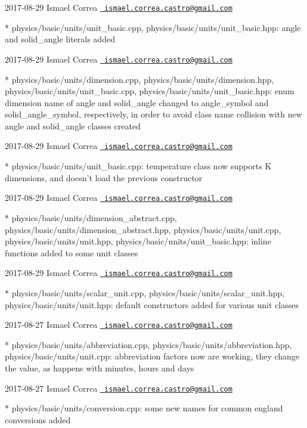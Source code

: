  2017-\/08-\/29 Ismael Correa \href{mailto:ismael.correa.castro@gmail.com}{\texttt{ ismael.\+correa.\+castro@gmail.\+com}} \begin{DoxyVerb}* physics/basic/units/unit_basic.cpp,
physics/basic/units/unit_basic.hpp: angle and solid_angle literals
added
\end{DoxyVerb}
 2017-\/08-\/29 Ismael Correa \href{mailto:ismael.correa.castro@gmail.com}{\texttt{ ismael.\+correa.\+castro@gmail.\+com}} \begin{DoxyVerb}* physics/basic/units/dimension.cpp,
physics/basic/units/dimension.hpp,
physics/basic/units/unit_basic.cpp,
physics/basic/units/unit_basic.hpp: enum dimension name of angle and
solid_angle changed to angle_symbol and solid_angle_symbol,
respectively, in order to avoid class name collision with new angle
and solid_angle classes created
\end{DoxyVerb}
 2017-\/08-\/29 Ismael Correa \href{mailto:ismael.correa.castro@gmail.com}{\texttt{ ismael.\+correa.\+castro@gmail.\+com}} \begin{DoxyVerb}* physics/basic/units/unit_basic.cpp: temperature class now supports
K dimensions, and doesn't load the previous constructor
\end{DoxyVerb}
 2017-\/08-\/29 Ismael Correa \href{mailto:ismael.correa.castro@gmail.com}{\texttt{ ismael.\+correa.\+castro@gmail.\+com}} \begin{DoxyVerb}* physics/basic/units/dimension_abstract.cpp,
physics/basic/units/dimension_abstract.hpp,
physics/basic/units/unit.cpp, physics/basic/units/unit.hpp,
physics/basic/units/unit_basic.hpp: inline functions added to some
unit classes
\end{DoxyVerb}
 2017-\/08-\/29 Ismael Correa \href{mailto:ismael.correa.castro@gmail.com}{\texttt{ ismael.\+correa.\+castro@gmail.\+com}} \begin{DoxyVerb}* physics/basic/units/scalar_unit.cpp,
physics/basic/units/scalar_unit.hpp, physics/basic/units/unit.hpp: 
default constructors added for various unit classes
\end{DoxyVerb}
 2017-\/08-\/27 Ismael Correa \href{mailto:ismael.correa.castro@gmail.com}{\texttt{ ismael.\+correa.\+castro@gmail.\+com}} \begin{DoxyVerb}* physics/basic/units/abbreviation.cpp,
physics/basic/units/abbreviation.hpp, physics/basic/units/unit.cpp: 
abbreviation factors now are working, they change the value, as
happens with minutes, hours and days
\end{DoxyVerb}
 2017-\/08-\/27 Ismael Correa \href{mailto:ismael.correa.castro@gmail.com}{\texttt{ ismael.\+correa.\+castro@gmail.\+com}} \begin{DoxyVerb}* physics/basic/units/conversion.cpp: some new names for common
england conversions added
\end{DoxyVerb}
